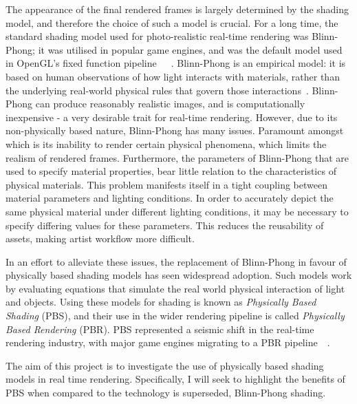 The appearance of the final rendered frames is largely determined by the shading model, and therefore the choice of such a model is crucial. For a long time, the standard shading model used for photo-realistic real-time rendering was Blinn-Phong; it was utilised in popular game engines, and was the default model used in OpenGL's fixed function pipeline~\cite{UnityBlinnPhong}~\cite{UnrealBlinnPhong}~\cite{OpenGLBlinnPhongFixedFunction}. Blinn-Phong is an empirical model: it is based on human observations of how light interacts with materials, rather than the underlying real-world physical rules that govern those interactions~\cite{PhongShading}. Blinn-Phong can produce reasonably realistic images, and is computationally inexpensive - a very desirable trait for real-time rendering. However, due to its non-physically based nature, Blinn-Phong has many issues. Paramount amongst which is its inability to render certain physical phenomena, which limits the realism of rendered frames. Furthermore, the parameters of Blinn-Phong that are used to specify material properties, bear little relation to the characteristics of physical materials. This problem manifests itself in a tight coupling between material parameters and lighting conditions. In order to accurately depict the same physical material under different lighting conditions, it may be necessary to specify differing values for these parameters. This reduces the reusability of assets, making artist workflow more difficult.

In an effort to alleviate these issues, the replacement of Blinn-Phong in favour of physically based shading models has seen widespread adoption. Such models work by evaluating equations that simulate the real world physical interaction of light and objects. Using these models for shading is known as \textit{Physically Based Shading} (PBS), and their use in the wider rendering pipeline is called \textit{Physically Based Rendering} (PBR). PBS represented a seismic shift in the real-time rendering industry, with major game engines migrating to a PBR pipeline~\cite{RealShadingInUnreal}~\cite{movingFrostbitetoPBR}.

The aim of this project is to investigate the use of physically based shading models in real time rendering. Specifically, I will seek to highlight the benefits of PBS when compared to the technology is superseded, Blinn-Phong shading.

